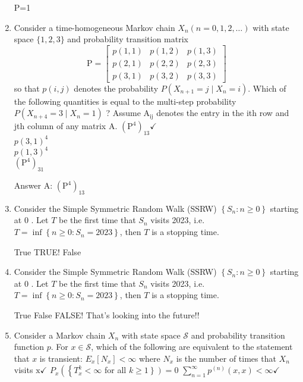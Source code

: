 \documentclass[10pt]{article}
\begin{document}
\begin{enumerate}
    P=1

  \item Consider a time-homogeneous Markov chain $X_n(n=0,1,2, \ldots)$ with state space $\{1,2,3\}$ and probability transition matrix
$$
\mathrm{P}=\left[\begin{array}{lll}
p(1,1) & p(1,2) & p(1,3) \\
p(2,1) & p(2,2) & p(2,3) \\
p(3,1) & p(3,2) & p(3,3)
\end{array}\right]
$$
so that $p(i, j)$ denotes the probability $P\left(X_{n+1}=j \mid
X_n=i\right)$. Which of the following quantities is equal to the
multi-step probability $P\left(X_{n+4}=3 \mid X_n=1\right)$ ?
Assume $\mathrm{A}_{\mathrm{ij}}$ denotes the entry in the ith row and jth
column of any matrix $\mathrm{A}$.
$\left(\mathrm{P}^4\right)_{13} \checkmark$ \\
$p(3,1)^4$ \\
$p(1,3)^4$ \\
$\left(\mathrm{P}^4\right)_{31}$

Answer A: $\left(\mathrm{P}^4\right)_{13}$

  \item Consider the Simple Symmetric Random Walk (SSRW)
    $\left\{S_n: n \geq 0\right\}$ starting at 0 . Let $T$ be the first
    time that $S_n$ visits 2023, i.e. $T=\inf \left\{n \geq 0: S_n=2023\right\}$, then $T$ is a stopping time.

True TRUE!
False

  \item Consider the Simple Symmetric Random Walk (SSRW)
    $\left\{S_n: n \geq 0\right\}$ starting at 0 . Let $T$ be the first
    time that $S_n$ visits 2023, i.e. $T=\inf \left\{n \geq 0: S_n=2023\right\}$, then $T$ is a stopping time.

True 
False FALSE!  That's looking into the future!!

  \item Consider a Markov chain $X_n$ with state space $\mathcal{S}$ and probability transition function $p$. For $x \in \mathcal{S}$, which of the following are equivalent to the statement that $x$ is transient:
$E_x\left[N_x\right]<\infty$ where $N_x$ is the number of times that $X_n$ visits $\mathrm{x} \checkmark$
$P_x\left(\left\{T_x^k<\infty\right.\right.$ for all $\left.\left.k \geq 1\right\}\right)=0$
$\sum_{n=1}^{\infty} p^{(n)}(x, x)<\infty \checkmark$



\end{enumerate}
\end{document}
